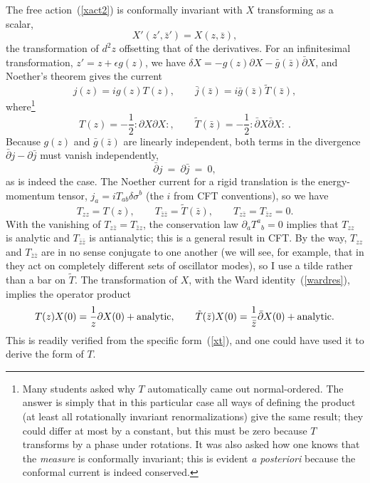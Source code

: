 The free action~(\ref{xact2}) is conformally invariant with
$X$ transforming as a scalar,
\begin{equation}
X'(z',\bar z') = X(z,\bar z),
\end{equation}
the transformation of $d^2 z$ offsetting that of the derivatives.
For an infinitesimal transformation, $z' = z + \epsilon g(z)$,
we have $\delta X = - g(z) \partial X - \bar g(\bar z) \bar\partial
X$, and Noether's theorem gives the current
\begin{equation}
j(z) = i g(z) T(z), \qquad \bar j(\bar z) = i \bar g(\bar z) \tilde
T(\bar z),
\end{equation}
where\footnote
{Many students asked why $T$ automatically came out normal-ordered.
The answer is simply that in this particular case all ways of
defining the product (at least all rotationally invariant
renormalizations) give the same result; they could differ at most by a
constant, but this must be zero because $T$ transforms by a phase
under rotations.  It was also asked how one knows that the {\it
measure} is conformally invariant; this is evident {\it a posteriori}
because the conformal current is indeed conserved.} 
\begin{equation}
T(z) = -\frac{1}{2} :\! \partial X \partial
X \! :, \qquad \tilde T(\bar z) = -\frac{1}{2} :\! \bar\partial X
\bar\partial X \! :\ .
\label{xt}
\end{equation}
Because $g(z)$ and $\bar g(\bar z)$ are linearly independent,
both terms in the divergence $\bar\partial j - \partial \bar j$
must vanish independently,
\begin{equation}
\bar\partial j \ =\ \partial \bar j \ =\ 0,
\end{equation}
as is indeed the case.
The Noether current for a rigid translation is 
the energy-momentum tensor, $j_a = i T_{ab}
\delta\sigma^b$ (the $i$ from CFT conventions), so we have
\begin{equation}
T_{zz} = T(z), \qquad T_{\bar z \bar z} = \tilde T(\bar z), \qquad
T_{z\bar z} = T_{\bar z z} = 0.
\end{equation}
With the vanishing of $T_{z\bar z} = T_{\bar z z}$, the conservation
law $\partial_a T^a\!_b = 0$ implies that $T_{zz}$ is analytic and
$T_{\bar z \bar z}$ is antianalytic; this is a general result in CFT.
By the way, $T_{zz}$ and $T_{\bar z \bar z}$ are in no sense
conjugate to one another (we will see, for example, that in they act
on completely different sets of oscillator modes), 
so I use
a tilde rather than a bar on $\tilde T$.
The transformation of $X$, with the Ward identity~(\ref{wardres}),
implies the operator product
\begin{equation}
T(z) X(0) = \frac{1}{z} \partial X(0) + {\rm analytic}, \qquad
\tilde T(\bar z) X(0) = \frac{1}{\bar z} \bar\partial X(0)
 + {\rm analytic} .
\end{equation}
This is readily verified from the specific form~(\ref{xt}), and one
could have used it to derive the form of $T$.

